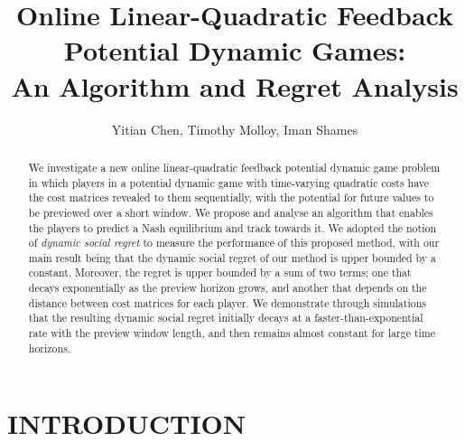 \documentclass[letterpaper, 10 pt, conference]{ieeeconf}  %
\title{\LARGE \bf
Online Linear-Quadratic Feedback Potential Dynamic Games:\\ An Algorithm and Regret Analysis
}
\author{Yitian Chen, Timothy Molloy, Iman Shames%
}
\begin{document}
\maketitle
\thispagestyle{empty}
\pagestyle{empty}

\begin{abstract}
We investigate a new online linear-quadratic feedback potential dynamic game problem in which players in a potential dynamic game with time-varying quadratic costs have the cost matrices revealed to them sequentially, with the potential for future values to be previewed over a short window.
We propose and analyse an algorithm that enables the players to predict a Nash equilibrium and track towards it.
We adopted the notion of \emph{dynamic social regret} to measure the performance of this proposed method, with our main result being that the dynamic social regret of our method is upper bounded by a constant. Moreover, the regret is upper bounded by a sum of two terms; one that decays exponentially as the preview horizon grows, and another that depends on the distance between cost matrices for each player. 
We demonstrate through simulations that the resulting dynamic social regret initially decays at a faster-than-exponential rate with the preview window length, and then remains almost constant for large time horizons.
\end{abstract}

\section{INTRODUCTION}
\end{document}
